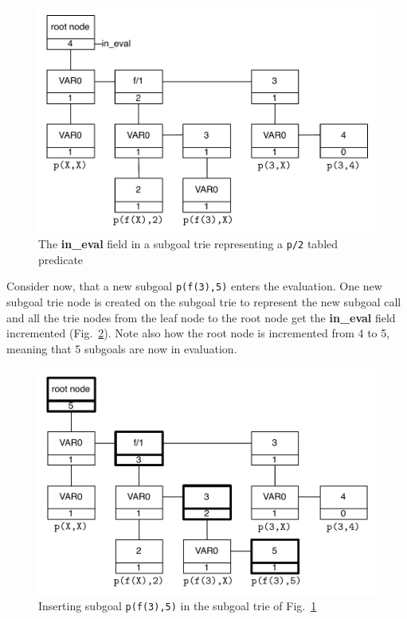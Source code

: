 \begin{figure}[ht]
\centering
\includegraphics[scale=0.6]{in_eval_trie}
\caption{The \textbf{in\_eval} field in a subgoal trie representing a \texttt{p/2}
  tabled predicate}
\label{fig:in_eval_trie}
\end{figure}

Consider now, that a new subgoal \texttt{p(f(3),5)} enters the
evaluation. One new subgoal trie node is created on the subgoal trie
to represent the new subgoal call and all the trie nodes from the leaf
node to the root node get the \textbf{in\_eval} field incremented
(Fig.~\ref{fig:in_eval_add}). Note also how the root node is
incremented from 4 to 5, meaning that 5 subgoals are now in
evaluation.

\begin{figure}[ht]
\centering
\includegraphics[scale=0.42]{in_eval_add}
\caption{Inserting subgoal \texttt{p(f(3),5)} in the subgoal trie of
  Fig.~\ref{fig:in_eval_trie}}
\label{fig:in_eval_add}
\end{figure}

